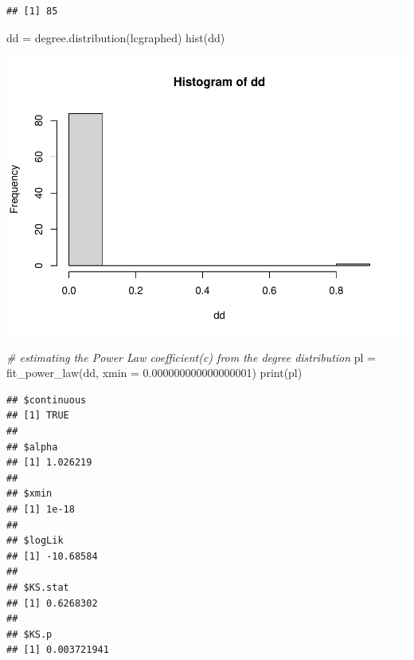 \documentclass[
]{article}
\newenvironment{Shaded}{\begin{snugshade}}{\end{snugshade}}
\newcommand{\AttributeTok}[1]{\textcolor[rgb]{0.77,0.63,0.00}{#1}}
\newcommand{\CommentTok}[1]{\textcolor[rgb]{0.56,0.35,0.01}{\textit{#1}}}
\newcommand{\FloatTok}[1]{\textcolor[rgb]{0.00,0.00,0.81}{#1}}
\newcommand{\FunctionTok}[1]{\textcolor[rgb]{0.00,0.00,0.00}{#1}}
\newcommand{\NormalTok}[1]{#1}
\newcommand{\OtherTok}[1]{\textcolor[rgb]{0.56,0.35,0.01}{#1}}
\newcommand{\SpecialCharTok}[1]{\textcolor[rgb]{0.00,0.00,0.00}{#1}}
\begin{document}
\begin{verbatim}
## [1] 85
\end{verbatim}

\begin{Shaded}
\begin{Highlighting}[]
\NormalTok{dd }\OtherTok{=} \FunctionTok{degree.distribution}\NormalTok{(lcgraphed)}
\FunctionTok{hist}\NormalTok{(dd)}
\end{Highlighting}
\end{Shaded}

\includegraphics{SMI-Project-2022_files/figure-latex/unnamed-chunk-4-1.pdf}

\begin{Shaded}
\begin{Highlighting}[]
\CommentTok{\# estimating the Power Law coefficient(c) from the degree distribution}
\NormalTok{pl }\OtherTok{=} \FunctionTok{fit\_power\_law}\NormalTok{(dd, }\AttributeTok{xmin =} \FloatTok{0.000000000000000001}\NormalTok{)}
\FunctionTok{print}\NormalTok{(pl)}
\end{Highlighting}
\end{Shaded}

\begin{verbatim}
## $continuous
## [1] TRUE
## 
## $alpha
## [1] 1.026219
## 
## $xmin
## [1] 1e-18
## 
## $logLik
## [1] -10.68584
## 
## $KS.stat
## [1] 0.6268302
## 
## $KS.p
## [1] 0.003721941
\end{verbatim}

\begin{Shaded}
\end{Shaded}
\end{document}
